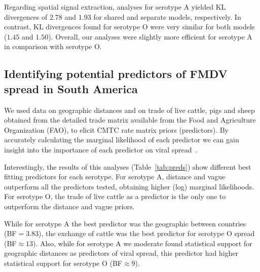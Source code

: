 \documentclass[10pt]{article}
\begin{document}
Regarding spatial signal extraction, analyses for serotype A yielded KL divergences of $2.78$ and $1.93$ for shared and separate models, respectively.
In contrast, KL divergences found for serotype O were very similar for both models ($1.45$ and $1.50$). 
Overall, our analyses were slightly more efficient for serotype A in comparison with serotype O.

\subsection*{Identifying potential predictors of FMDV spread in South America}

We used data on geographic distances and on trade of live cattle, pigs and sheep obtained from the detailed trade matrix available from the Food and Agriculture Organization (FAO), to elicit CMTC rate matrix priors (predictors).
By accurately calculating the marginal likelihood of each predictor we can gain insight into the importance of each predictor on viral spread~\cite{Carvalho2013,Nelson2011}.

Interestingly, the results of this analyses (Table~\ref{tab:preds}) show different best fitting predictors for each serotype.
For serotype A, distance and vague outperform all the predictors tested, obtaining higher (log) marginal likelihoods.
For serotype O, the trade of live cattle as a predictor is the only one to outperform the distance and vague priors.

While for serotype A the best predictor was the geographic between countries (BF$=3.83$), the exchange of cattle was the best predictor for serotype O spread (BF$\approx 13$).
Also, while for serotype A we moderate found statistical support for geographic distances as predictors of viral spread, this predictor had higher statistical support for serotype O (BF$\approx 9$).
\end{document}
